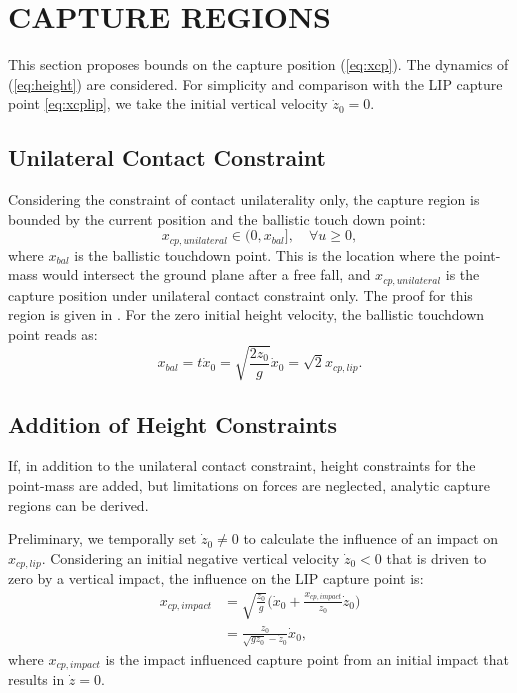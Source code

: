 \documentclass[letterpaper, 10 pt, conference]{ieeeconf}  %
\begin{document}
\section{CAPTURE REGIONS}\label{sec:regions}
This section proposes bounds on the capture position (\ref{eq:xcp}). The dynamics of (\ref{eq:height}) are considered. For simplicity and comparison with the LIP capture point \ref{eq:xcplip}, we take the initial vertical velocity $\dot{z}_0=0$.
\subsection{Unilateral Contact Constraint}
 Considering the constraint of contact unilaterality only, the capture region is bounded by the current position and the ballistic touch down point:
\begin{equation}
	x_{cp,unilateral} \in (0, x_{bal}], \quad \forall u \geq 0, 
	\label{eq:xcpuni}
\end{equation}
where $x_{bal}$ is the ballistic touchdown point. This is the location where the point-mass would intersect the ground plane after a free fall, and $x_{cp,unilateral}$ is the capture position under unilateral contact constraint only. The proof for this region is given in \cite{koolen2016balance}. For the zero initial height velocity, the ballistic touchdown point reads as:
\begin{equation}
 x_{bal}=t \dot{x}_0=\sqrt{\frac{2z_0}{g}}\dot{x}_0=\sqrt{2}x_{cp,lip}.
 	\label{eq:xbal}
\end{equation}

\subsection{Addition of Height Constraints}
If, in addition to the unilateral contact constraint, height constraints for the point-mass are added, but limitations on forces are neglected, analytic capture regions can be derived. 

Preliminary, we temporally set $\dot{z}_0 \neq 0$ to calculate the influence of an impact on $x_{cp,lip}$. Considering an initial negative vertical velocity $\dot{z}_0<0$ that is driven to zero by a vertical impact, the influence on the LIP capture point is:
\begin{align}
	x_{cp,impact} &= \sqrt{\frac{z_0}{g}}\Big(\dot{x}_0 + \frac{x_{cp,impact}}{z_0}\dot{z}_0\Big)\\
	&=\frac{z_0}{\sqrt{gz_0}-\dot{z}_0}\dot{x}_0, \label{eq:xcpimpact}
\end{align}
where $x_{cp,impact}$ is the impact influenced capture point from an initial impact that results in $\dot{z}=0$.
\end{document}

